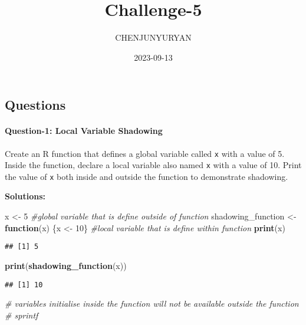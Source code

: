 \documentclass[
]{article}
\title{Challenge-5}
\author{CHENJUNYURYAN}
\date{2023-09-13}
\newenvironment{Shaded}{\begin{snugshade}}{\end{snugshade}}
\newcommand{\CommentTok}[1]{\textcolor[rgb]{0.56,0.35,0.01}{\textit{#1}}}
\newcommand{\ControlFlowTok}[1]{\textcolor[rgb]{0.13,0.29,0.53}{\textbf{#1}}}
\newcommand{\DecValTok}[1]{\textcolor[rgb]{0.00,0.00,0.81}{#1}}
\newcommand{\FunctionTok}[1]{\textcolor[rgb]{0.13,0.29,0.53}{\textbf{#1}}}
\newcommand{\NormalTok}[1]{#1}
\newcommand{\OtherTok}[1]{\textcolor[rgb]{0.56,0.35,0.01}{#1}}
\begin{document}
\maketitle

\hypertarget{questions}{%
\subsection{Questions}\label{questions}}

\hypertarget{question-1-local-variable-shadowing}{%
\paragraph{Question-1: Local Variable
Shadowing}\label{question-1-local-variable-shadowing}}

Create an R function that defines a global variable called \texttt{x}
with a value of 5. Inside the function, declare a local variable also
named \texttt{x} with a value of 10. Print the value of \texttt{x} both
inside and outside the function to demonstrate shadowing.

\textbf{Solutions:}

\begin{Shaded}
\begin{Highlighting}[]
\NormalTok{x }\OtherTok{\textless{}{-}} \DecValTok{5} \CommentTok{\#global variable that is define outside of function}
\NormalTok{shadowing\_function }\OtherTok{\textless{}{-}} \ControlFlowTok{function}\NormalTok{(x) \{x }\OtherTok{\textless{}{-}} \DecValTok{10}\NormalTok{\} }\CommentTok{\#local variable that is define within function}
\FunctionTok{print}\NormalTok{(x)}
\end{Highlighting}
\end{Shaded}

\begin{verbatim}
## [1] 5
\end{verbatim}

\begin{Shaded}
\begin{Highlighting}[]
\FunctionTok{print}\NormalTok{(}\FunctionTok{shadowing\_function}\NormalTok{(x))}
\end{Highlighting}
\end{Shaded}

\begin{verbatim}
## [1] 10
\end{verbatim}

\begin{Shaded}
\begin{Highlighting}[]
\CommentTok{\# variables initialise inside the function will not be available outside the function}
\CommentTok{\# sprintf }
\end{Highlighting}
\end{Shaded}
\end{document}
